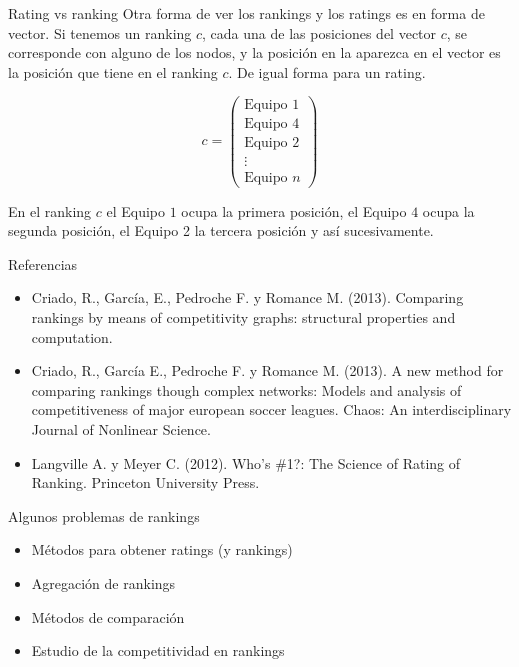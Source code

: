 \documentclass[10pt,hyperref={unicode}]{beamer}
\begin{document}
	
	
	\begin{frame}{Rating vs ranking}
		Otra forma de ver los rankings y los ratings es en forma de vector. Si tenemos un ranking $c$, cada una de las posiciones del vector $c$, se corresponde con alguno de los nodos, y la posición en la aparezca en el vector es la posición que tiene en el ranking $c$. De igual forma para un rating.
		
		\begin{ejemplo}
			$$ c = \left(
			\begin{array}{c}
			\text{Equipo } 1 \\
			\text{Equipo } 4 \\
			\text{Equipo } 2 \\
			\vdots \\
			\text{Equipo } n
			\end{array}
			\right) $$
				
			En el ranking $c$ el Equipo $1$ ocupa la primera posición, el Equipo $4$ ocupa la segunda posición, el Equipo 2 la tercera posición y así sucesivamente.
			
		\end{ejemplo}
	\end{frame}
	
	\begin{frame}{Referencias}
		\begin{itemize}
		\item Criado, R., García, E., Pedroche F. y Romance M. (2013). Comparing rankings by means of competitivity graphs: structural properties and computation.
		
		\item Criado, R., García E., Pedroche F. y Romance M. (2013). A new method for comparing rankings though complex networks: Models and analysis of competitiveness of major european soccer leagues. Chaos: An interdisciplinary Journal of Nonlinear Science.
		
		\item Langville A. y Meyer C. (2012). Who's \#1?: The Science of Rating of Ranking. Princeton University Press.  
		\end{itemize}
		\end{frame}
	
	\begin{frame}{Algunos problemas de rankings}
			\begin{itemize}
			\item Métodos para obtener ratings (y rankings)
			\item Agregación de rankings
			\item Métodos de comparación
			\item Estudio de la competitividad en rankings
			\end{itemize}
		\end{frame}
	
\end{document}
